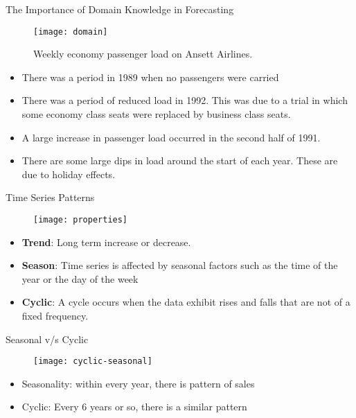\documentclass{beamer}
\begin{document}
\begin{frame}{The Importance of Domain Knowledge in Forecasting}
\begin{figure}
	\centering
	\texttt{[image: domain]}
	\caption{Weekly economy passenger load on Ansett Airlines.}
	\vspace{-15pt}
	\label{fig:forecast}
\end{figure}
\begin{itemize}
	\item There was a period in 1989 when no passengers were carried
	\item There was a period of reduced load in 1992. This was due to a trial in which some economy class seats were replaced by business class seats.
	\item A large increase in passenger load occurred in the second half of 1991.
	\item There are some large dips in load around the start of each year. These are due to holiday effects.
\end{itemize}

\end{frame}

\begin{frame}{Time Series Patterns}
\begin{figure}
	\centering
	\texttt{[image: properties]}

	\vspace{-15pt}
	\label{fig:forecast}
\end{figure}

\begin{itemize}
	\item \textbf{Trend}: Long term increase or decrease. 
	\item \textbf{Season}: Time series is affected by seasonal factors such as the time of the year or the day of the week
	\item \textbf{Cyclic}: A cycle occurs when the data exhibit rises and falls that are not of a fixed frequency.
\end{itemize}

\end{frame}

\begin{frame}{Seasonal v/s Cyclic}
\begin{figure}
	\centering
	\texttt{[image: cyclic-seasonal]}
	
	\vspace{-15pt}
	\label{fig:forecast}
\end{figure}

\begin{itemize}
	\item Seasonality: within every year, there is pattern of sales
	\item Cyclic: Every 6 years or so, there is a similar pattern
\end{itemize}
\end{frame}
\end{document}
